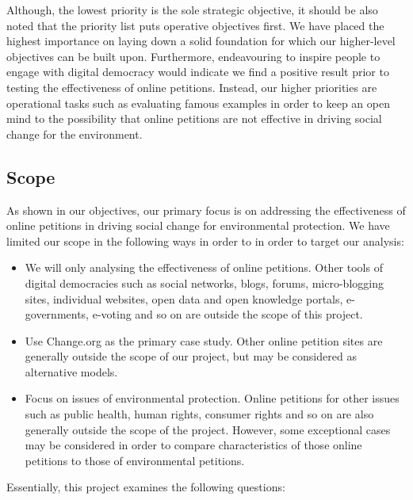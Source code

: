 Although, the lowest priority is the sole strategic objective, it should be also noted that the priority list puts operative objectives first. We have placed the highest importance on laying down a solid foundation for which our higher-level objectives can be built upon. Furthermore, endeavouring to inspire people to engage with digital democracy would indicate we find a positive result prior to testing the effectiveness of online petitions. Instead, our higher priorities are operational tasks such as evaluating famous examples in order to keep an open mind to the possibility that online petitions are not effective in driving social change for the environment.

\subsection{Scope}
\label{sec:scope}
As shown in our objectives, our primary focus is on addressing the effectiveness of online petitions in driving social change for environmental protection. We have limited our scope in the following ways in order to in order to target our analysis:

\begin{itemize}
  \item We will only analysing the effectiveness of online petitions. Other tools of digital democracies such as social networks, blogs, forums, micro-blogging sites, individual websites, open data and open knowledge portals, e-governments, e-voting and so on are outside the scope of this project.
  \item Use Change.org as the primary case study. Other online petition sites are generally outside the scope of our project, but may be considered as alternative models.
  \item Focus on issues of environmental protection. Online petitions for other issues such as public health, human rights, consumer rights and so on are also generally outside the scope of the project. However, some exceptional cases may be considered in order to compare characteristics of those online petitions to those of environmental petitions.
\end{itemize}

Essentially, this project examines the following questions:

